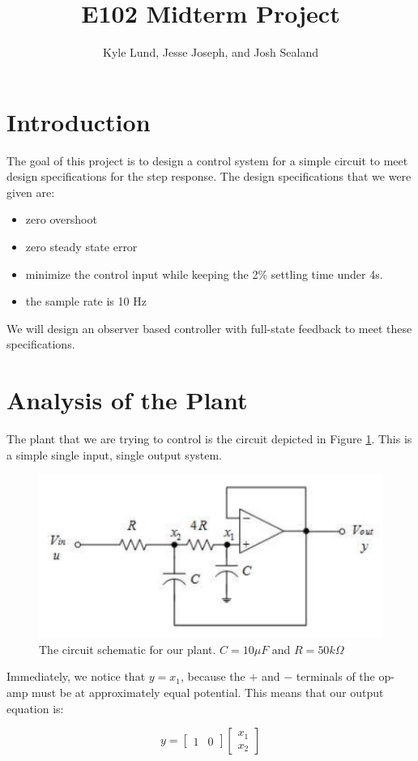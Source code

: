 \documentclass[11pt]{article}
\title{\vspace{100pt} E102 Midterm Project \vspace{20pt}}
\author{Kyle Lund, Jesse Joseph, and Josh Sealand}
\begin{document}
\maketitle
\pagebreak

\section*{Introduction}
The goal of this project is to design a control system for a simple circuit to meet design specifications for the step response.
The design specifications that we were given are:
\begin{itemize}[noitemsep]
\item zero overshoot
\item zero steady state error
\item minimize the control input while keeping the 2\% settling time under 4s.
\item the sample rate is 10 Hz
\end{itemize}
We will design an observer based controller with full-state feedback to meet these specifications.

\section*{Analysis of the Plant}
The plant that we are trying to control is the circuit depicted in Figure \ref{fig:circuit}.
This is a simple single input, single output system.

\begin{figure}[h]
\centering
\includegraphics[width=0.6\linewidth]{circuit}
\caption{The circuit schematic for our plant. $C = 10\mu F$ and $R=50k\Omega$}
\label{fig:circuit}
\end{figure}

Immediately, we notice that $y=x_1$, because the $+$ and $-$ terminals of the op-amp must be at approximately equal potential.
This means that our output equation is:

\begin{equation}
y = \begin{bmatrix}
1 & 0
\end{bmatrix}
\begin{bmatrix}
x_1 \\ x_2
\end{bmatrix}
\end{equation}
\end{document}
